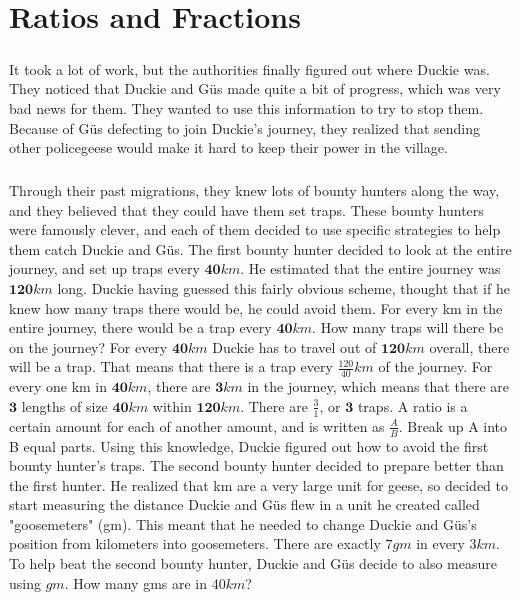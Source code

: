 \chapter{Ratios and Fractions}
\paragraph{} It took a lot of work, but the authorities finally figured out where Duckie was. They noticed that Duckie and Güs made quite a bit of progress, which was very bad news for them. They wanted to use this information to try to stop them. Because of Güs defecting to join Duckie's journey, they realized that sending other policegeese would make it hard to keep their power in the village. 
\paragraph{} Through their past migrations, they knew lots of bounty hunters along the way, and they believed that they could have them set traps. These bounty hunters were famously clever, and each of them decided to use specific strategies to help them catch Duckie and Güs.
\vfill
\pagebreak
{The first bounty hunter decided to look at the entire journey, and set up traps every $\textbf{40} km$. He estimated that the entire journey was $\textbf{120} km$ long. Duckie having guessed this fairly obvious scheme,  thought that if he knew how many traps there would be, he could avoid them. For every km in the entire journey, there would be a trap every $\textbf{40} km$. How many traps will there be on the journey?}
{For every $\textbf{40} km$ Duckie has to travel out of $\textbf{120} km$ overall, there will be a trap. That means that there is a trap every $\frac{120}{40} km$ of the journey. For every one km in $\textbf{40} km$, there are $\textbf{3} km$ in the journey, which means that there are $\textbf{3}$ lengths of size $\textbf{40} km$ within $\textbf{120} km$. There are $\frac{3}{1}$, or $\textbf{3}$ traps.}
{A ratio is a certain amount for each of another amount, and is written as $\frac{A}{B}$. Break up A into B equal parts.}
{}
{Using this knowledge, Duckie figured out how to avoid the first bounty hunter's traps. The second bounty hunter decided to prepare better than the first hunter. He realized that km are a very large unit for geese, so decided to start measuring the distance Duckie and Güs flew in a unit he created called "goosemeters" (gm). This meant that he needed to change Duckie and Güs's position from kilometers into goosemeters. There are exactly $7 gm$ in every $3 km$. To help beat the second bounty hunter, Duckie and Güs decide to also measure using $gm$. How many gms are in $40 km$?}
